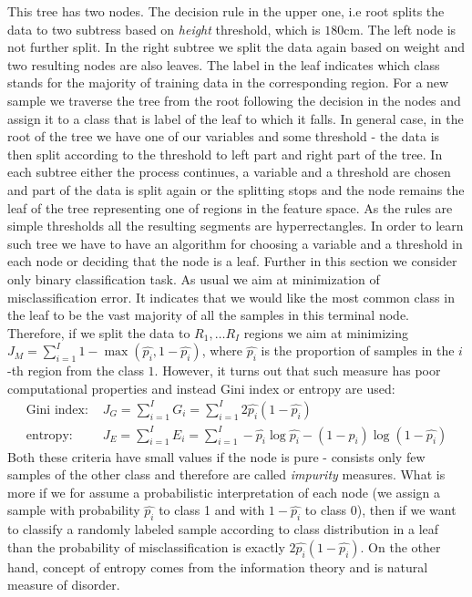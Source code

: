 \documentclass[12pt, wide]{mwart}
\begin{document}
This tree has two nodes. The decision rule in the upper one, i.e root splits the data to two subtress based on \textit{height} threshold, which is $180$cm. The left node is not further split. In the right subtree we split the data again based on weight and two resulting nodes are also leaves. The label in the leaf indicates which class stands for the majority of training data in the corresponding region. For a new sample we traverse the tree from the root following the decision in the nodes and assign it to a class that is label of the leaf to which it falls. In general case, in the root of the tree we have one of our variables and some threshold - the data is then split according to the threshold to left part and right part of the tree. In each subtree either the process continues, a variable and a threshold are chosen and part of the data is split again or the splitting stops and the node remains the leaf of the tree representing one of regions in the feature space. As the rules are simple thresholds all the resulting segments are hyperrectangles. In order to learn such tree we have to have an algorithm for choosing a variable and a threshold in each node or deciding that the node is a leaf. Further in this section we consider only binary classification task. As usual we aim at minimization of misclassification error. It indicates that we would like the most common class in the leaf to be the vast majority of all the samples in this terminal node. Therefore, if we split the data to $R_1, \ldots R_I$ regions we aim at minimizing $J_M = \sum_{i=1}^I 1 - \max(\hat{p_i}, 1-\hat{p_i})$, where $\hat{p_i}$ is the proportion of samples in the $i$-th region from the class $1$. However, it turns out that such measure has poor computational properties and instead Gini index or entropy are used:
\begin{align*}
        \text{Gini index:  } &J_G = \sum_{i=1}^I G_i = \sum_{i=1}^I 2\hat{p_i}(1-\hat{p_i}) \\
        \text{entropy:  } &J_E = \sum_{i=1}^I E_i= \sum_{i=1}^I -\hat{p_i}\log \hat{p_i} - (1-\hat{p_i}) \log (1-\hat{p_i})
\end{align*}
Both these criteria have small values if the node is pure - consists only few samples of the other class and therefore are called \textit{impurity} measures. What is more if we for assume a probabilistic interpretation of each node (we assign a sample with probability $\hat{p_i}$ to class 1 and with $1-\hat{p_i}$ to class 0), then if we want to classify a randomly labeled sample according to class distribution in a leaf than the probability of misclassification is exactly $2\hat{p_i}(1-\hat{p_i})$. On the other hand, concept of entropy comes from the information theory and is natural measure of disorder.
\end{document}
